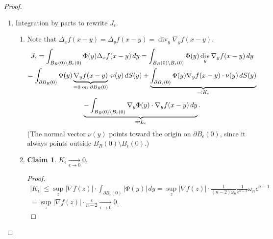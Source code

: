 \documentclass[12pt]{article}
\DeclareMathOperator{\diver}{div}
\theoremstyle{definition}
\newtheorem*{claim*}{Claim}
\begin{document}
\begin{proof}
\begin{enumerate}[label=\arabic*.]
\item Integration by parts to rewrite $J_\epsilon$.

\begin{enumerate}[label=(\arabic*),resume]
\item\label{integrals} Note that $\Delta_xf(x-y)=\Delta_yf(x-y)=\diver_y\nabla_yf(x-y)$.
\begin{multline*}
J_\epsilon=\int_{B_R(0)\setminus B_\epsilon(0)}\Phi(y)\Delta_xf(x-y)\,dy=\int_{B_R(0)\setminus B_\epsilon(0)}\Phi(y)\diver_y\nabla_yf(x-y)\,dy\\
=\int_{\partial B_R(0)}\Phi(y)\underbrace{\nabla_yf(x-y)}_{\mathclap{=0\text{ on }\partial B_R(0)}}\cdot\nu(y)\,dS(y)+\underbrace{\int_{\partial B_\epsilon(0)}\Phi(y)\nabla_yf(x-y)\cdot\nu(y)\,dS(y)}_{\eqqcolon K_\epsilon}\\
\underbrace{-\int_{B_R(0)\setminus B_\epsilon(0)}\nabla_y\Phi(y)\cdot\nabla_yf(x-y)\,dy}_{\eqqcolon L_\epsilon}.
\end{multline*}
(The normal vector $\nu(y)$ points toward the origin on $\partial B_\epsilon(0)$, since it always points outside $B_R(0)\setminus B_\epsilon(0)$.)

\item\label{Kepsto0}
\begin{claim*}
$K_\epsilon\xrightarrow[\epsilon\to0]{}0$.
\end{claim*}

\begin{proof}
\begin{multline*}
|K_\epsilon|\leq\sup_z|\nabla f(z)|\cdot\int_{\partial B_\epsilon(0)}|\Phi(y)|\,dy=\sup_z|\nabla f(z)|\cdot\frac1{(n-2)\omega_n}\frac1{\epsilon^{n-2}}\omega_n\epsilon^{n-1}\\
=\sup_z|\nabla f(z)|\cdot\frac\epsilon{n-2}\xrightarrow[\epsilon\to0]{}0.
\end{multline*}
\end{proof}
\end{enumerate}


\end{enumerate}
\end{proof}
\end{document}
